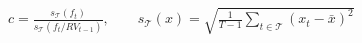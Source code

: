 \documentclass[11pt,border=2pt]{standalone}
\begin{document}
{\color{mathblue}$\displaystyle c=\frac{s_{\mathcal T}(f_t)}{s_{\mathcal T}\!\left(f_t/RV_{t-1}\right)},\qquad s_{\mathcal T}(x)=\sqrt{\frac{1}{T-1}\sum_{t\in\mathcal T}(x_t-\bar x)^2}$}
\end{document}
